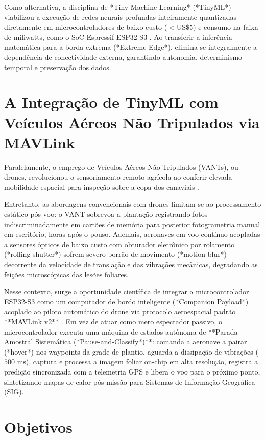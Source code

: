 Como alternativa, a disciplina de *Tiny Machine Learning* (*TinyML*) \cite{warden2019,moons2020} viabilizou a execução de redes neurais profundas inteiramente quantizadas diretamente em microcontroladores de baixo custo ($< \text{US\$} 5$) e consumo na faixa de miliwatts, como o SoC Espressif ESP32-S3 \cite{esp32s3}. Ao transferir a inferência matemática para a borda extrema (*Extreme Edge*), elimina-se integralmente a dependência de conectividade externa, garantindo autonomia, determinismo temporal e preservação dos dados.

\section{A Integração de TinyML com Veículos Aéreos Não Tripulados via MAVLink}

Paralelamente, o emprego de Veículos Aéreos Não Tripulados (VANTs), ou drones, revolucionou o sensoriamento remoto agrícola ao conferir elevada mobilidade espacial para inspeção sobre a copa dos canaviais \cite{radoglou2020compilation}.

Entretanto, as abordagens convencionais com drones limitam-se ao processamento estático pós-voo: o VANT sobrevoa a plantação registrando fotos indiscriminadamente em cartões de memória para posterior fotogrametria manual em escritório, horas após o pouso. Ademais, aeronaves em voo contínuo acopladas a sensores ópticos de baixo custo com obturador eletrônico por rolamento (*rolling shutter*) sofrem severo borrão de movimento (*motion blur*) decorrente da velocidade de translação e das vibrações mecânicas, degradando as feições microscópicas das lesões foliares.

Nesse contexto, surge a oportunidade científica de integrar o microcontrolador ESP32-S3 como um computador de bordo inteligente (*Companion Payload*) acoplado ao piloto automático do drone via protocolo aeroespacial padrão **MAVLink v2** \cite{koubaa2019mavlink}. Em vez de atuar como mero espectador passivo, o microcontrolador executa uma máquina de estados autônoma de **Parada Amostral Sistemática (*Pause-and-Classify*)**: comanda a aeronave a pairar (*hover*) nos waypoints da grade de plantio, aguarda a dissipação de vibrações ($500\text{ ms}$), captura e processa a imagem foliar on-chip em alta resolução, registra a predição sincronizada com a telemetria GPS e libera o voo para o próximo ponto, sintetizando mapas de calor pós-missão para Sistemas de Informação Geográfica (SIG).

\section{Objetivos}

